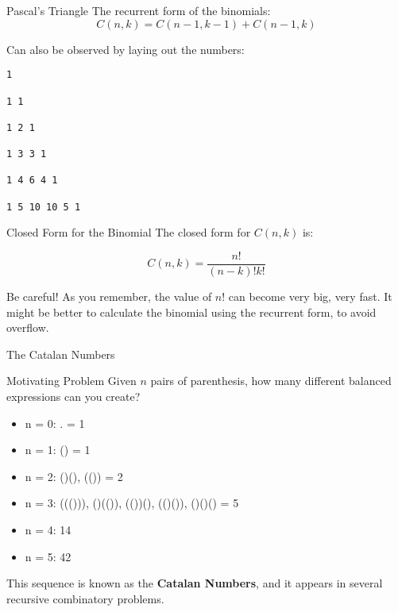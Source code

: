 \begin{frame}[fragile]{Pascal's Triangle}
  The recurrent form of the binomials:
  \begin{equation*}
    C(n,k) = C(n-1,k-1) + C(n-1,k)
  \end{equation*}

  Can also be observed by laying out the numbers:

\begin{verbatim}
1

1 1

1 2 1

1 3 3 1

1 4 6 4 1

1 5 10 10 5 1
\end{verbatim}
\end{frame}

\begin{frame}{Closed Form for the Binomial}
  The closed form for $C(n,k)$ is:\bigskip

    \begin{equation*}
      C(n,k) = \frac{n!}{(n-k)!k!}
    \end{equation*}\bigskip

  Be careful! As you remember, the value of $n!$ can become very big,
  very fast. It might be better to calculate the binomial using the recurrent
  form, to avoid overflow.
\end{frame}

\begin{frame}{The Catalan Numbers}
  \begin{block}{Motivating Problem}
    Given $n$ pairs of parenthesis, how many different balanced expressions can you create?\bigskip

    \begin{itemize}
      \item n = 0: . = 1
      \item n = 1: () = 1
      \item n = 2: ()(), (()) = 2
      \item n = 3: ((())), ()(()), (())(), (()()), ()()() = 5
      \item n = 4: 14
      \item n = 5: 42
    \end{itemize}
  \end{block}\bigskip

  This sequence is known as the {\bf Catalan Numbers}, and it appears in
  several recursive combinatory problems.
\end{frame}

